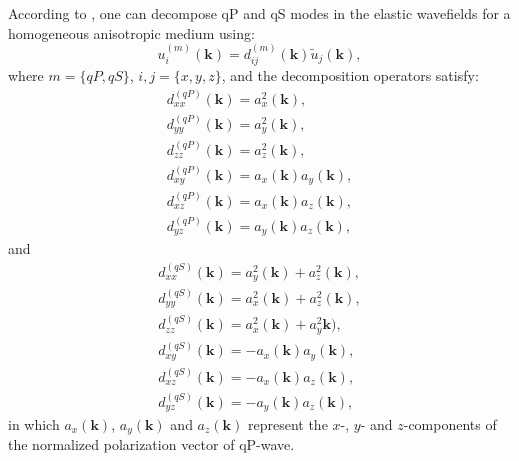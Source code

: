 According to \cite{zhang.mcmechan:2010}, one can decompose qP and qS modes in
the elastic wavefields for a homogeneous anisotropic medium using:
\begin{equation}
\label{eq:decomPS}
u_i^{(m)}(\mathbf{k})=d_{ij}^{(m)}(\mathbf{k})\tilde{u}_j(\mathbf{k}),
\end{equation} 
where $m=\{qP, qS\}$, $i, j=\{x, y, z\}$, and the decomposition operators satisfy:
\begin{equation}
\begin{array}{lcl}
\label{eq:decP}
    d_{xx}^{(qP)}(\mathbf{k}) = a_{x}^2(\mathbf{k}), \\ 
    d_{yy}^{(qP)}(\mathbf{k}) = a_{y}^2(\mathbf{k}), \\ 
    d_{zz}^{(qP)}(\mathbf{k}) = a_{z}^2(\mathbf{k}), \\
    d_{xy}^{(qP)}(\mathbf{k}) = a_{x}(\mathbf{k})a_{y}(\mathbf{k}),
    \\
    d_{xz}^{(qP)}(\mathbf{k}) = a_{x}(\mathbf{k})a_{z}(\mathbf{k}),
    \\
    d_{yz}^{(qP)}(\mathbf{k}) = a_{y}(\mathbf{k})a_{z}(\mathbf{k}),
\end{array}
\end{equation}
and 
\begin{equation}
\begin{array}{lcl}
\label{eq:decS}
    d_{xx}^{(qS)}(\mathbf{k}) = a_{y}^2(\mathbf{k})+a_{z}^2(\mathbf{k}), \\ 
    d_{yy}^{(qS)}(\mathbf{k}) = a_{x}^2(\mathbf{k})+a_{z}^2(\mathbf{k}), \\ 
    d_{zz}^{(qS)}(\mathbf{k}) = a_{x}^2(\mathbf{k})+a_{y}^2\mathbf{k}), \\ 
    d_{xy}^{(qS)}(\mathbf{k}) = -a_{x}(\mathbf{k})a_{y}(\mathbf{k}),
    \\
    d_{xz}^{(qS)}(\mathbf{k}) = -a_{x}(\mathbf{k})a_{z}(\mathbf{k}),
    \\
    d_{yz}^{(qS)}(\mathbf{k}) = -a_{y}(\mathbf{k})a_{z}(\mathbf{k}),
\end{array}
\end{equation}
in which $a_{x}(\mathbf{k})$, $a_{y}(\mathbf{k})$ and
$a_{z}(\mathbf{k})$ represent the $x$-, $y$- and $z$-components
of the normalized polarization vector of qP-wave.

